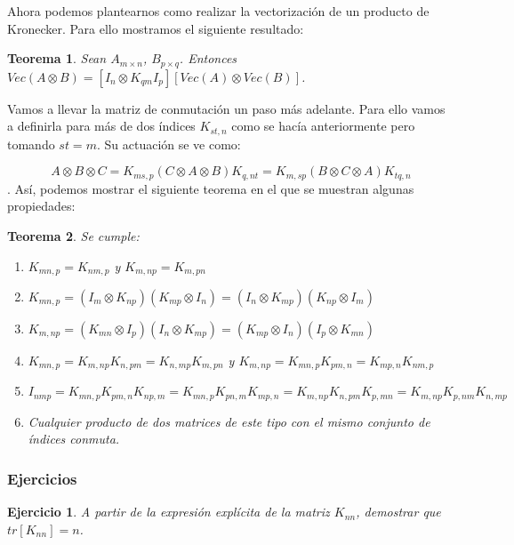 \documentclass{article}
\theoremstyle{theorem-style}  %
\newtheorem{theorem}{Teorema}[section]  %
\theoremstyle{definition-style}
\theoremstyle{example-style}
\theoremstyle{exercise-style}
\newtheorem{exercise}{Ejercicio}[section]
\begin{document}
	Ahora podemos plantearnos como realizar la vectorización de un producto de Kronecker. Para ello mostramos el siguiente resultado:
	
	\begin{theorem}
		Sean $A_{m \times n}$, $B_{p \times q}$. Entonces $Vec(A\otimes B)= [I_n \otimes K_{qm} I_p][Vec(A) \otimes Vec(B)]$. 
	\end{theorem}
	
	Vamos a llevar la matriz de conmutación un paso más adelante. Para ello vamos a definirla para más de dos índices
	$K_{st,n}$ como se hacía anteriormente pero tomando $st=m$. Su actuación se ve como:
	
	$$ A \otimes B \otimes C = K_{ms,p}(C \otimes A \otimes B)K_{q,nt} = K_{m,sp}(B \otimes C \otimes A)K_{tq,n}$$. Así, podemos mostrar el siguiente teorema en el que se muestran algunas propiedades:
	
	\begin{theorem} Se cumple:\\
		\begin{enumerate}
			\item  $K_{mn,p}=K_{nm,p}$ y $K_{m,np} = K_{m,pn} $ 
			
			\item $K_{mn,p}=(I_m \otimes K_{np})(K_{mp} \otimes I_n)=(I_n \otimes K_{mp})(K_{np} \otimes I_m)$
			
			\item $K_{m,np}=(K_{mn} \otimes I_p)(I_n \otimes K_{mp})=(K_{mp} \otimes I_n)(I_p \otimes K_{mn})$
			
			\item $K_{mn,p}= K_{m,np}K_{n,pm} = K_{n,mp}K_{m,pn}$ y $K_{m,np}= K_{mn,p}K_{pm,n} = K_{mp,n}K_{nm,p}$
			
			\item $I_{nmp}= K_{mn,p}K_{pm,n}K_{np,m}= K_{mn,p}K_{pn,m}K_{mp,n}=K_{m,np}K_{n,pm}K_{p,mn}=K_{m,np}K_{p,nm}K_{n,mp}$
			
			\item Cualquier producto de dos matrices de este tipo con el mismo conjunto de índices conmuta.
		\end{enumerate}	
	\end{theorem}
	
	\subsubsection{Ejercicios}
	
	\begin{exercise}
		A partir de la expresión explícita de la matriz $K_{nn}$, demostrar que $tr[K_{nn}] = n$.
	\end{exercise}
	
\end{document}
